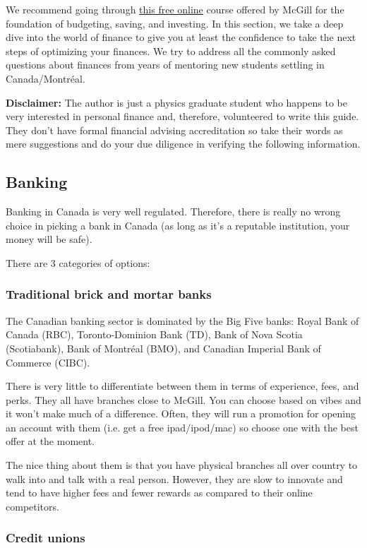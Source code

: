 We recommend going through \href{https://mcgillpersonalfinance.com/}{this free online} course offered by McGill for the foundation of budgeting, saving, and investing. In this section, we take a deep dive into the world of finance to give you at least the confidence to take the next steps of optimizing your finances. We try to address all the commonly asked questions about finances from years of mentoring new students settling in Canada/Montr\'eal.

\textbf{\color{ocre}Disclaimer:} The author is just a physics graduate student who happens to be very interested in personal finance and, therefore, volunteered to write this guide. They don't have formal financial advising accreditation so take their words as mere suggestions and do your due diligence in verifying the following information. 

\subsection{Banking} 
Banking in Canada is very well regulated. Therefore, there is really no wrong choice in picking a bank in Canada (as long as it's a reputable institution, your money will be safe). 

There are 3 categories of options:

\subsubsection{Traditional brick and mortar banks
}

The Canadian banking sector is dominated by the Big Five banks: Royal Bank of Canada (RBC), Toronto-Dominion Bank (TD), Bank of Nova Scotia (Scotiabank), Bank of Montr\'eal (BMO), and Canadian Imperial Bank of Commerce (CIBC).

There is very little to differentiate between them in terms of experience, fees, and perks. They all have branches close to McGill. You can choose based on vibes and it won't make much of a difference. Often, they will run a promotion for opening an account with them (i.e. get a free ipad/ipod/mac) so choose one with the best offer at the moment.

The nice thing about them is that you have physical branches all over country to walk into and talk with a real person. However, they are slow to innovate and tend to have higher fees and fewer rewards as compared to their online competitors.

\subsubsection{Credit unions
}

